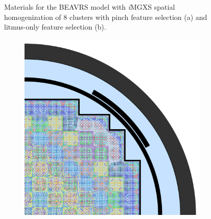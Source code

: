 \begin{figure}[h!]
\begin{subfigure}{0.67\textwidth}
  \caption{}
  \label{fig:chap10-full-core-combined-8}
\end{subfigure}
\caption[Clustered geometries for BEAVRS]{Materials for the \ac{BEAVRS} model with \textit{i}\ac{MGXS} spatial homogenization of 8 clusters with pinch feature selection (a) and litmus-only feature selection (b).}
\label{fig:chap10-full-core-geometries-8}
\end{figure}

\clearpage

\begin{figure}[h!]
\centering
\begin{subfigure}{0.67\textwidth}
  \centering
  \includegraphics[width=\linewidth]{figures/unsupervised/geometries/with-features/16-clusters/pinch/full-core}
  \caption{}
  \label{fig:chap10-full-core-pinch-16}
\end{subfigure}
\begin{subfigure}{0.67\textwidth}
  \centering

\end{subfigure}
\end{figure}
